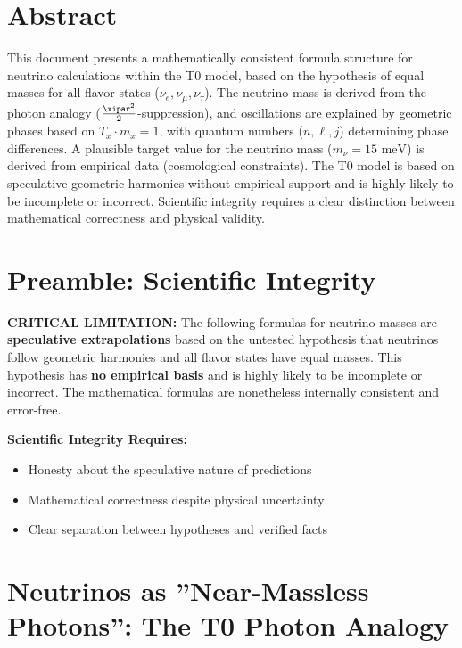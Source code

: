 \section*{Abstract}
		This document presents a mathematically consistent formula structure for neutrino calculations within the T0 model, based on the hypothesis of equal masses for all flavor states (\(\nu_e, \nu_\mu, \nu_\tau\)). The neutrino mass is derived from the photon analogy (\(\frac{\xipar^2}{2}\)-suppression), and oscillations are explained by geometric phases based on \( T_x \cdot m_x = 1 \), with quantum numbers (\(n, \ell, j\)) determining phase differences. A plausible target value for the neutrino mass (\(m_\nu = 15 \text{ meV}\)) is derived from empirical data (cosmological constraints). The T0 model is based on speculative geometric harmonies without empirical support and is highly likely to be incomplete or incorrect. Scientific integrity requires a clear distinction between mathematical correctness and physical validity.

	

	\section{Preamble: Scientific Integrity}
	
	\begin{warning}
		\textbf{CRITICAL LIMITATION:} The following formulas for neutrino masses are \textbf{speculative extrapolations} based on the untested hypothesis that neutrinos follow geometric harmonies and all flavor states have equal masses. This hypothesis has \textbf{no empirical basis} and is highly likely to be incomplete or incorrect. The mathematical formulas are nonetheless internally consistent and error-free.
		
		\vspace{0.5cm}
		\textbf{Scientific Integrity Requires:}
		\begin{itemize}
			\item Honesty about the speculative nature of predictions
			\item Mathematical correctness despite physical uncertainty
			\item Clear separation between hypotheses and verified facts
		\end{itemize}
	\end{warning}
	
	\section{Neutrinos as ''Near-Massless Photons'': The T0 Photon Analogy}
	
